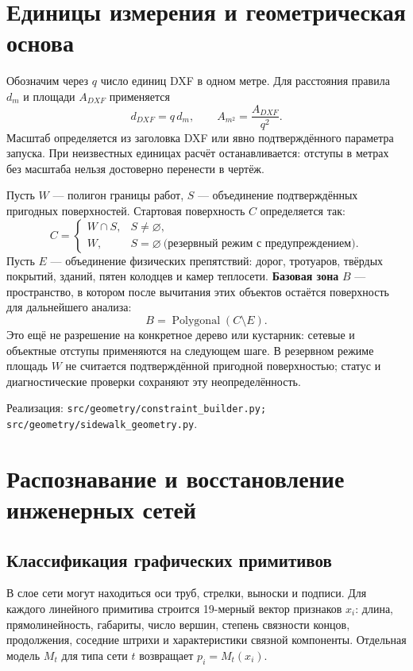 \documentclass[11pt,a4paper]{article}
\newcommand{\src}[1]{\par{\small\color{muted}Реализация: \texttt{#1}.}\par}
\begin{document}
\section{Единицы измерения и геометрическая основа}
Обозначим через $q$ число единиц DXF в одном метре. Для расстояния правила $d_m$ и площади $A_{DXF}$ применяется
\begin{equation}
d_{DXF}=q\,d_m,\qquad A_{m^2}=\frac{A_{DXF}}{q^2}.
\end{equation}
Масштаб определяется из заголовка DXF или явно подтверждённого параметра запуска. При неизвестных единицах расчёт останавливается: отступы в метрах без масштаба нельзя достоверно перенести в чертёж.

Пусть $W$ --- полигон границы работ, $S$ --- объединение подтверждённых пригодных поверхностей. Стартовая поверхность $C$ определяется так:
\begin{equation}
C=\begin{cases}W\cap S,& S\ne\varnothing,\\W,& S=\varnothing\ \text{(резервный режим с предупреждением).}\end{cases}
\end{equation}
Пусть $E$ --- объединение физических препятствий: дорог, тротуаров, твёрдых покрытий, зданий, пятен колодцев и камер теплосети. \textbf{Базовая зона} $B$ --- пространство, в котором после вычитания этих объектов остаётся поверхность для дальнейшего анализа:
\begin{equation}
B=\operatorname{Polygonal}(C\setminus E).
\end{equation}
Это ещё не разрешение на конкретное дерево или кустарник: сетевые и объектные отступы применяются на следующем шаге. В резервном режиме площадь $W$ не считается подтверждённой пригодной поверхностью; статус и диагностические проверки сохраняют эту неопределённость.
\src{src/geometry/constraint\_builder.py; src/geometry/sidewalk\_geometry.py}

\section{Распознавание и восстановление инженерных сетей}
\subsection{Классификация графических примитивов}
В слое сети могут находиться оси труб, стрелки, выноски и подписи. Для каждого линейного примитива строится 19-мерный вектор признаков $x_i$: длина, прямолинейность, габариты, число вершин, степень связности концов, продолжения, соседние штрихи и характеристики связной компоненты. Отдельная модель $M_t$ для типа сети $t$ возвращает $p_i=M_t(x_i)$.
\end{document}
